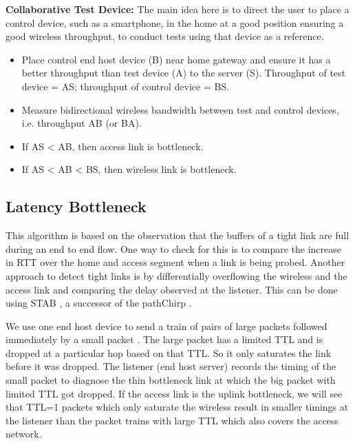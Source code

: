 \textbf{Collaborative Test Device:} The main idea here is to direct the user to place a control device, such as a smartphone, in the home at a good position ensuring a good wireless throughput, to conduct tests using that device as a reference. %
\begin{itemize}%
\item Place control end host device (B) near home gateway and ensure it has a better throughput than test device (A) to the server (S). Throughput of test device = AS; throughput of control device = BS.
\item Measure bidirectional wireless bandwidth between test and control devices, i.e. throughput AB (or BA).
\item If AS < AB, then access link is bottleneck.%
\item If AS < AB < BS, then wireless link is bottleneck.%
\end{itemize}


\subsection{Latency Bottleneck}
\label{latency}

This algorithm is based on the observation that the buffers of a tight link are full during an end to end flow. One way to check for this is to compare the increase in RTT over the home and access segment when a link is being probed. Another approach to detect tight links is by differentially overflowing the wireless and the access link and comparing the delay observed at the listener. This can be done using STAB \cite{stab}, a successor of the pathChirp \cite{pathchirp}.

We use one end host device to send a train of pairs of large packets followed immediately by a small packet . The large packet has a limited TTL and is dropped at a particular hop based on that TTL. So it only saturates the link before it was dropped. The listener (end host server) records the timing of the small packet to diagnose the thin bottleneck link at which the big packet with limited TTL got dropped. If the access link is the uplink bottleneck, we will see that TTL=1 packets which only saturate the wireless result in smaller timings at the listener than the packet trains with large TTL which also covers the access network.